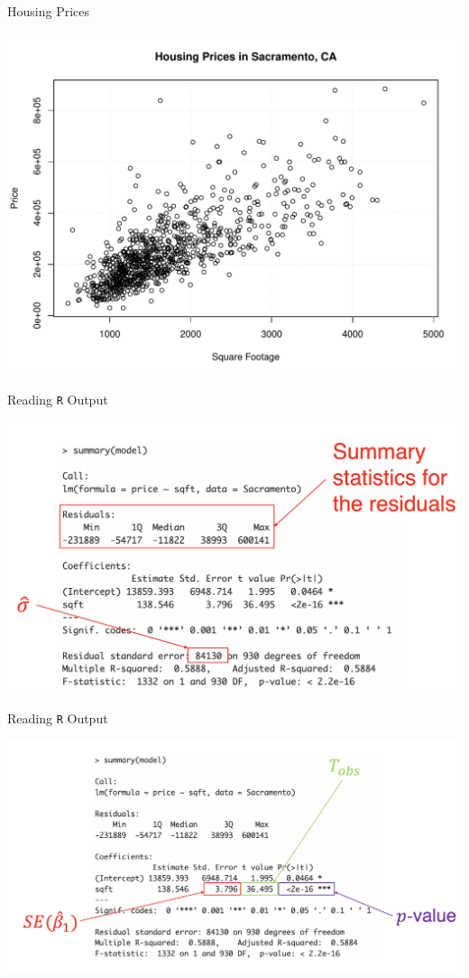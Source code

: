 \documentclass{beamer}
\begin{document}
\begin{frame}{Housing Prices}
    \begin{center}
        \includegraphics[width=.85\linewidth]{figures/sacramento.pdf}
    \end{center}
\end{frame}

\begin{frame}{Reading \texttt{R} Output}
    \begin{center}
        \includegraphics[width=\linewidth]{figures/resid.png}
    \end{center}
\end{frame}

\begin{frame}{Reading \texttt{R} Output}
    \begin{center}
        \includegraphics[width=\linewidth]{figures/se_t_p.png}
    \end{center}
\end{frame}
\end{document}
